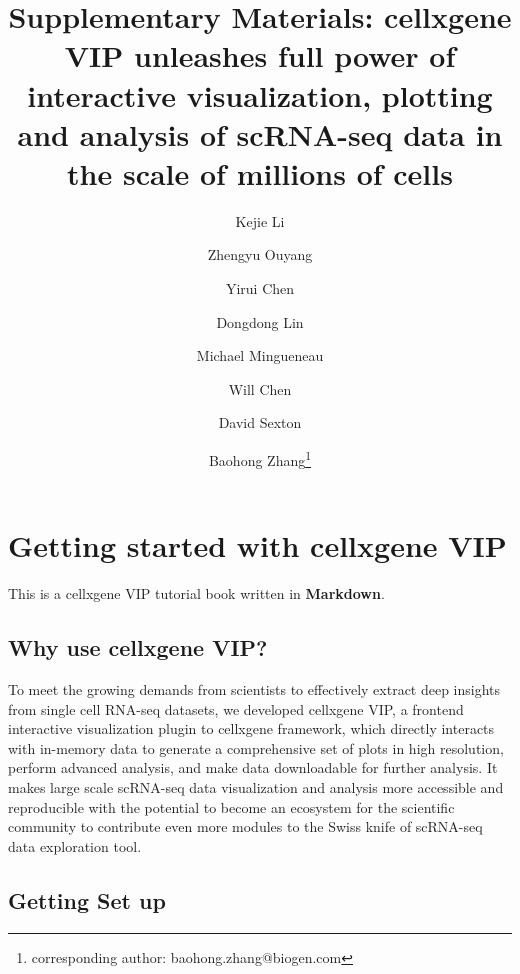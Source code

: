 \documentclass[
]{article}
\author{}
\date{\vspace{-2.5em}}
\begin{document}
\author[1]{Kejie Li}
\author[2]{Zhengyu Ouyang}
\author[1]{Yirui Chen}
\author[1]{Dongdong Lin}
\author[1]{Michael Mingueneau}
\author[1]{Will Chen}
\author[1]{David Sexton}
\author[1]{Baohong Zhang\thanks{corresponding author: baohong.zhang@biogen.com}}
                                           
\title{\textbf{Supplementary Materials}: cellxgene VIP unleashes full power of interactive visualization, plotting and analysis of scRNA-seq data in the scale of millions of cells}

\maketitle


{
\setcounter{tocdepth}{2}
\tableofcontents
}
\hypertarget{getting-started-with-cellxgene-vip}{%
\section{Getting started with cellxgene VIP}\label{getting-started-with-cellxgene-vip}}

This is a cellxgene VIP tutorial book written in \textbf{Markdown}.

\hypertarget{why-use-cellxgene-vip}{%
\subsection{Why use cellxgene VIP?}\label{why-use-cellxgene-vip}}

To meet the growing demands from scientists to effectively extract deep insights from single cell RNA-seq datasets, we developed cellxgene VIP, a frontend interactive visualization plugin to cellxgene framework, which directly interacts with in-memory data to generate a comprehensive set of plots in high resolution, perform advanced analysis, and make data downloadable for further analysis. It makes large scale scRNA-seq data visualization and analysis more accessible and reproducible with the potential to become an ecosystem for the scientific community to contribute even more modules to the Swiss knife of scRNA-seq data exploration tool.

\hypertarget{getting-set-up}{%
\subsection{Getting Set up}\label{getting-set-up}}
\end{document}

